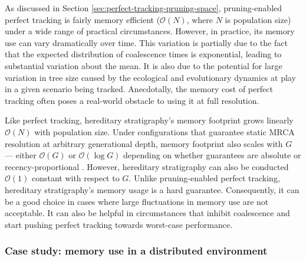 As discussed in Section \ref{sec:perfect-tracking-pruning-space}, pruning-enabled perfect tracking is fairly memory efficient ($\mathcal{O}(N)$, where $N$ is population size) under a wide range of practical circumstances.
However, in practice, its memory use can vary dramatically over time.
This variation is partially due to the fact that the expected distribution of coalescence times is exponential, leading to substantial variation about the mean.
It is also due to the potential for large variation in tree size caused by the ecological and evolutionary dynamics at play in a given scenario being tracked.
Anecdotally, the memory cost of perfect tracking often poses a real-world obstacle to using it at full resolution.

Like perfect tracking, hereditary stratigraphy's memory footprint grows linearly $\mathcal{O}(N)$ with population size.
Under configurations that guarantee static MRCA resolution at arbitrary generational depth, memory footprint also scales with $G$ --- either $\mathcal{O}(G)$ or $\mathcal{O}(\log G)$ depending on whether guarantees are absolute or recency-proportional \citep{moreno2024algorithms}.
However, hereditary stratigraphy can also be conducted $\mathcal{O}(1)$ constant with respect to $G$.
Unlike pruning-enabled perfect tracking, hereditary stratigraphy's memory usage is a hard guarantee.
Consequently, it can be a good choice in cases where large fluctuations in memory use are not acceptable.
It can also be helpful in circumstances that inhibit coalescence and start pushing perfect tracking towards worst-case performance.

\subsubsection{Case study: memory use in a distributed environment}

